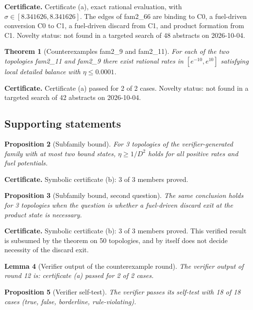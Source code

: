 \documentclass[11pt]{article}
\newtheorem{theorem}{Theorem}\newtheorem{proposition}[theorem]{Proposition}\newtheorem{lemma}[theorem]{Lemma}\newtheorem{corollary}[theorem]{Corollary}
\theoremstyle{definition}\newtheorem{definition}[theorem]{Definition}\newtheorem{example}[theorem]{Example}
\begin{document}
\textbf{Certificate.} Certificate (a), exact rational evaluation, with \(\sigma\in[8.341626,8.341626]\). The edges of fam2\_66 are binding to C0, a fuel-driven conversion C0 to C1, a fuel-driven discard from C1, and product formation from C1. Novelty status: not found in a targeted search of 48 abstracts on 2026-10-04.

\begin{theorem}[Counterexamples fam2_9 and fam2_11]
For each of the two topologies fam2\_11 and fam2\_9 there exist rational rates in \([e^{-10},e^{10}]\) satisfying local detailed balance with \(\eta\le 0.0001\).
\end{theorem}

\textbf{Certificate.} Certificate (a) passed for 2 of 2 cases. Novelty status: not found in a targeted search of 42 abstracts on 2026-10-04.

\subsection{Supporting statements}\label{supporting-statements}

\begin{proposition}[Subfamily bound]
For 3 topologies of the verifier-generated family with at most two bound states, \(\eta\ge 1/D^{2}\) holds for all positive rates and fuel potentials.
\end{proposition}

\textbf{Certificate.} Symbolic certificate (b): 3 of 3 members proved.

\begin{proposition}[Subfamily bound, second question]
The same conclusion holds for 3 topologies when the question is whether a fuel-driven discard exit at the product state is necessary.
\end{proposition}

\textbf{Certificate.} Symbolic certificate (b): 3 of 3 members proved. This verified result is subsumed by the theorem on 50 topologies, and by itself does not decide necessity of the discard exit.

\begin{lemma}[Verifier output of the counterexample round]
The verifier output of round 12 is: certificate (a) passed for 2 of 2 cases.
\end{lemma}

\begin{proposition}[Verifier self-test]
The verifier passes its self-test with 18 of 18 cases (true, false, borderline, rule-violating).
\end{proposition}
\end{document}
